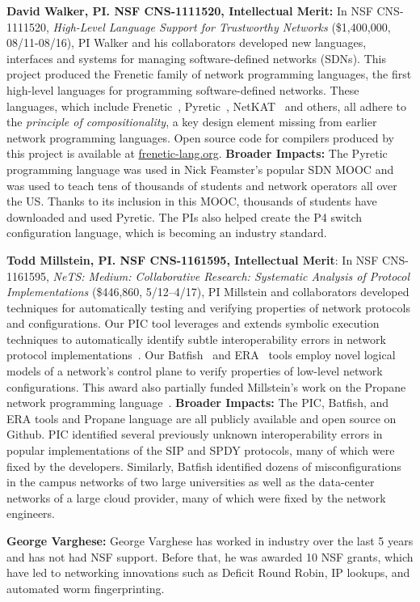 \noindent
{\bf David Walker, PI. NSF CNS-1111520, Intellectual Merit:}
In NSF CNS-1111520, \emph{High-Level Language Support for Trustworthy Networks}
(\$1,400,000, 08/11-08/16),
PI Walker and his collaborators developed new languages, interfaces
and systems for managing software-defined networks (SDNs).  
This project produced the Frenetic family
of network programming languages, the first high-level languages for
programming software-defined networks.  These languages, which include
Frenetic~\cite{frenetic}, 
Pyretic~\cite{pyretic},
NetKAT~\cite{netkat} and others, all adhere to the
\emph{principle of compositionality}, a key design element missing
from earlier network programming languages.  
Open source code for compilers produced by this project is available
at \url{frenetic-lang.org}.
%
{\bf Broader Impacts:} 
The Pyretic programming language was used in Nick Feamster's popular
SDN MOOC and was used to teach tens of thousands of students and
network operators all over the US.  Thanks to its inclusion in this
MOOC, thousands of students have downloaded and used Pyretic.  The PIs
also helped create the P4 switch configuration language, which is
becoming an industry standard.

\medskip
\noindent
{\bf Todd Millstein, PI. NSF CNS-1161595, Intellectual Merit}: In NSF CNS-1161595, {\em NeTS: Medium: Collaborative Research: Systematic Analysis of Protocol Implementations} (\$446,860, 5/12--4/17), PI Millstein and collaborators developed techniques for automatically testing and verifying properties of network protocols and configurations.  Our PIC tool leverages and extends symbolic execution techniques to automatically identify subtle interoperability errors in network protocol implementations~\cite{DBLP:conf/nsdi/PedrosaFKGMM15}.  Our Batfish~\cite{batfish} and ERA~\cite{era} tools employ novel logical models of a network's control plane to verify properties of low-level network configurations.  This award also partially funded Millstein's work on the Propane network programming language~\cite{beckett+:propane}. 
%
{\bf Broader Impacts:} The PIC, Batfish, and ERA tools and Propane language are all publicly available and open source on Github.  PIC identified several previously unknown interoperability errors in popular implementations of the SIP and SPDY protocols, many of which were fixed by the developers.  Similarly, Batfish identified dozens of misconfigurations in the campus networks of two large universities as well as the data-center networks of a large cloud provider, many of which were fixed by the network engineers.

{\bf George Varghese:} George Varghese has worked in industry over the last 5 years and has not had NSF support.  Before that, he was awarded 10 NSF grants, which have led to networking innovations such as Deficit Round Robin, IP lookups, and automated worm fingerprinting.


